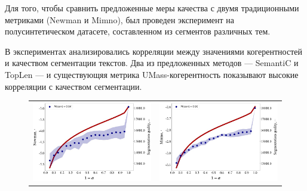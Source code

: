 Для того, чтобы сравнить предложенные меры качества с двумя традиционными метриками (Newman и Mimno), был проведен эксперимент на полусинтетическом датасете, составленном из сегментов различных тем. 

В экспериментах анализировались корреляции между значениями когерентностей и качеством сегментации текстов. Два из предложенных методов --- SemantiC и TopLen --- и существующяя метрика UMass-когерентность показывают высокие корреляции с качеством сегментации. 

\begin{figure}
\begin{tabular}{cc}
    \includegraphics[width=70mm]{images/segm_mimno.png} &   \includegraphics[width=70mm]{images/segm_newman.png} \\
    

\end{tabular}
\end{figure}
